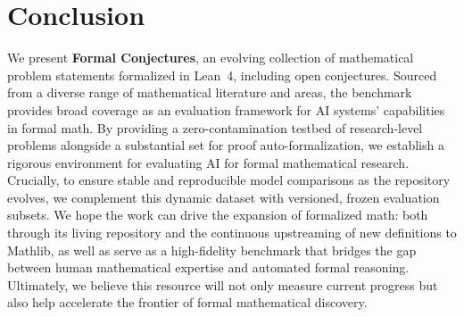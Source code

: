 \section{Conclusion}\label{sec:conclusion}
We present \textbf{Formal Conjectures}, an evolving collection of mathematical problem statements formalized in Lean~4, including open conjectures.
Sourced from a diverse range of mathematical literature and areas, the benchmark provides broad coverage as an evaluation framework for AI systems' capabilities in formal math.
By providing a zero-contamination testbed of research-level problems alongside a substantial set for proof auto-formalization, we establish a rigorous environment for evaluating AI for formal mathematical research.
Crucially, to ensure stable and reproducible model comparisons as the repository evolves, we complement this dynamic dataset with versioned, frozen evaluation subsets.
We hope the work can drive the expansion of formalized math: both through its living repository and the continuous upstreaming of new definitions to Mathlib, as well as serve as a high-fidelity benchmark that bridges the gap between human mathematical expertise and automated formal reasoning.
Ultimately, we believe this resource will not only measure current progress but also help accelerate the frontier of formal mathematical discovery.
